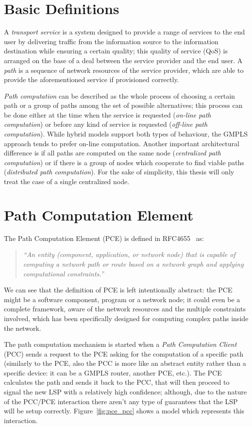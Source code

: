 \documentclass[10pt,a4paper]{report}
\begin{document}
\section{Basic Definitions}

A \textit{transport service} is a system designed to provide a range
of services to the end user by delivering traffic from the information
source to the information destination while ensuring a certain
quality; this quality of service (QoS) is arranged on the base of a
deal between the service provider and the end user. A \textit{path} is
a sequence of network resources of the service provider, which are
able to provide the aforementioned service if provisioned correctly.

\textit{Path computation} can be described as the whole process of
choosing a certain path or a group of paths among the set of possible
alternatives; this process can be done either at the time when the
service is requested (\textit{on-line path computation}) or before any
kind of service is requested (\textit{off-line path
  computation}). While hybrid models support both types of behaviour,
the GMPLS approach tends to prefer on-line computation. Another
important architectural difference is if all paths are computed on the
same node (\textit{centralized path computation}) or if there is a
group of nodes which cooperate to find viable paths
(\textit{distributed path computation}). For the sake of simplicity,
this thesis will only treat the case of a single centralized node.

\section{Path Computation Element}

The Path Computation Element (PCE) is defined in
RFC4655~\cite{rfc4655} as:
\begin{quote}
  \textit{``An entity (component, application, or network node) that
    is capable of computing a network path or route based on a network
    graph and applying computational constraints.''}
\end{quote}
We can see that the definition of PCE is left intentionally abstract:
the PCE might be a software component, program or a network node; it
could even be a complete framework, aware of the network resources and
the multiple constraints involved, which has been specifically
designed for computing complex paths inside the network.

The path computation mechanism is started when a \textit{Path
  Computation Client} (PCC) sends a request to the PCE asking for the
computation of a specific path (similarly to the PCE, also the PCC is
more like an abstract entity rather than a specific device: it can be
a GMPLS router, another PCE, etc.). The PCE calculates the path and
sends it back to the PCC, that will then proceed to signal the new LSP
with a relatively high confidence; although, due to the nature of the
PCC/PCE interaction there aren't any type of guarantees that the LSP
will be setup correctly. Figure~\ref{fig:pce_pcc} shows a model which
represents this interaction.
\end{document}
